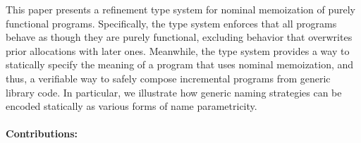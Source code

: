 \documentclass{purple}
\begin{document}

This paper presents a refinement type system for nominal memoization
of purely functional programs.  Specifically, the type system enforces
that all programs behave as though they are purely functional,
excluding behavior that overwrites prior allocations with later ones.
%
Meanwhile, the type system provides a way to statically specify the
meaning of a program that uses nominal memoization, and thus, a
verifiable way to safely compose incremental programs from generic
library code.
%
In particular, we illustrate how generic naming strategies can be
encoded statically as various forms of name parametricity.

\paragraph{Contributions:}
\end{document}
